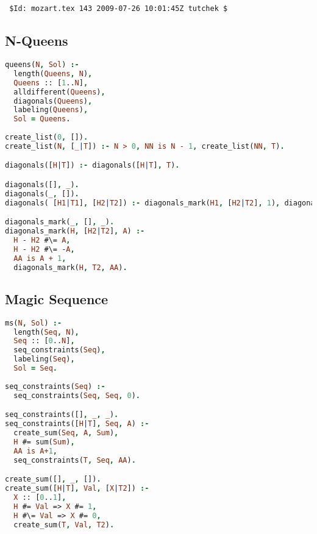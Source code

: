 \section{\eclipse}
\verb= $Id: mozart.tex 143 2009-07-26 10:01:45Z tutchek $ =

\subsection{N-Queens}
\begin{lstlisting}[language=Prolog]
queens(N, Sol) :- 
  length(Queens, N),
  Queens :: [1..N],
  alldifferent(Queens),
  diagonals(Queens),
  labeling(Queens),
  Sol = Queens.
  
create_list(0, []).
create_list(N, [_|T]) :- N > 0, NN is N - 1, create_list(NN, T).

diagonals([H|T]) :- diagonals([H|T], T).

diagonals([], _).
diagonals(_, []).
diagonals( [H1|T1], [H2|T2]) :- diagonals_mark(H1, [H2|T2], 1), diagonals(T1, T2).

diagonals_mark(_, [], _).
diagonals_mark(H, [H2|T2], A) :-
  H - H2 #\= A,
  H - H2 #\= -A,
  AA is A + 1,
  diagonals_mark(H, T2, AA).
\end{lstlisting}

\subsection{Magic Sequence}
\begin{lstlisting}[language=Prolog]
ms(N, Sol) :-
  length(Seq, N),
  Seq :: [0..N],
  seq_constraints(Seq),
  labeling(Seq),
  Sol = Seq.
  
seq_constraints(Seq) :-
  seq_constraints(Seq, Seq, 0).

seq_constraints([], _, _).
seq_constraints([H|T], Seq, A) :-
  create_sum(Seq, A, Sum),
  H #= sum(Sum),
  AA is A+1,
  seq_constraints(T, Seq, AA).

create_sum([], _, []).
create_sum([H|T], Val, [X|T2]) :-
  X :: [0..1],
  H #= Val => X #= 1,
  H #\= Val => X #= 0,
  create_sum(T, Val, T2).
\end{lstlisting}

